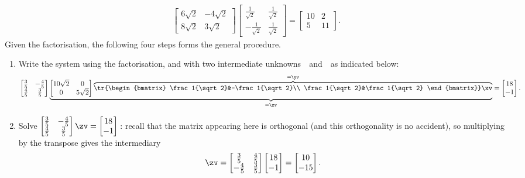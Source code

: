 \begin{example}
\begin{solution}
\begin{eqnarray*}
\begin{bmatrix} 6{\sqrt2}& -4{\sqrt2}
\\ 8{\sqrt2}&3{\sqrt2} \end{bmatrix}
\begin{bmatrix} \frac1{\sqrt2}&\frac1{\sqrt2}\\ -\frac1{\sqrt2}&\frac1{\sqrt2} \end{bmatrix}
=\begin{bmatrix} 10&2\\5&11 \end{bmatrix}.
\end{eqnarray*}
Given the factorisation, the following four steps forms the general procedure. 
\begin{enumerate}
\item Write the system using the factorisation, and with two intermediate unknowns~\yv\ and~\zv\ as indicated below:
\begin{equation*}
\begin{bmatrix} \frac35&-\frac45\\\frac45&\frac35 \end{bmatrix}
\underbrace{\begin{bmatrix} 10\sqrt2&0\\0&5\sqrt2 \end{bmatrix}
\overbrace{\tr{\begin{bmatrix} \frac1{\sqrt2}&-\frac1{\sqrt2}\\ \frac1{\sqrt2}&\frac1{\sqrt2} \end{bmatrix}}\xv}^{=\yv}}_{=\zv}=\begin{bmatrix} 18\\-1 \end{bmatrix}.
\end{equation*}

\item Solve \(\begin{bmatrix} \frac35&-\frac45\\\frac45&\frac35 \end{bmatrix}\zv=\begin{bmatrix} 18\\-1 \end{bmatrix}\)\,: recall that the matrix appearing here is orthogonal (and this orthogonality is no accident), so multiplying by the transpose gives the intermediary
\begin{equation*}
\zv=\begin{bmatrix} \frac35&\frac45\\-\frac45&\frac35 \end{bmatrix}
\begin{bmatrix} 18\\-1 \end{bmatrix}
=\begin{bmatrix} 10\\-15 \end{bmatrix}.
\end{equation*}


\end{enumerate}
\end{solution}
\end{example}
